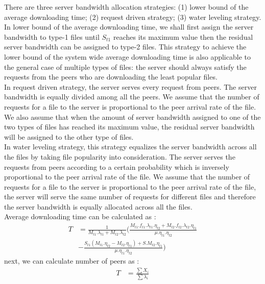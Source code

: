 \documentclass[conference]{IEEEtran}
\begin{document}
There are three server bandwidth allocation strategies:  (1) lower bound of the average downloading time; (2) request driven strategy; (3) water leveling strategy.
In lower bound of the average downloading time, we shall first assign the server bandwidth to type-1 files until $S_{t1}$ reaches its maximum value then the residual server bandwidth can be assigned to type-2 files.
This strategy to achieve the lower bound of the system wide average downloading time is also applicable to the general case of multiple types of files: the server should always satisfy the requests from the peers who are downloading the least popular files.\\
In request driven strategy, the server serves every request from peers. 
The server bandwidth is equally divided among all the peers.
We assume that the number of requests for a file to the server is proportional to the peer arrival rate of the file. 
We also assume that when the amount of server bandwidth assigned to one of the two types of files has reached its maximum value, the residual server bandwidth will be assigned to the other type of files.\\
In water leveling strategy, this strategy equalizes the server bandwidth across all the files by taking file popularity into consideration. 
The server serves the requests from peers according to a certain probability which is inversely proportional to the peer arrival rate of the file.
We assume that the number of requests for a file to the server is proportional to the peer arrival rate of the file, the server will serve the same number of requests for different files and therefore the server bandwidth is equally allocated across all the files.\\
Average downloading time can be calculated as \cite{Sun:2009:POS:1542245.1542249}:
\begin{equation}\label{eqn:averagetimedownload}
\begin{split}
T &= \frac{1}{M_{t1}.\lambda_{t1} + M_{t2}.\lambda_{t2}}(\frac{M_{t1}.f_{t1}.\lambda_{t1}.\eta_{t2} + M_{t2}.f_{t2}.\lambda_{t2}.\eta_{t1}}{\mu.\eta_{t1}.\eta_{t2}}  \\ 
   & - \frac{S_{t1} (M_{t1}.\eta_{t2}-M_{t2}.\eta_{t1}) + S.M_{t2}.\eta_{t1}}{\mu.\eta_{t1}.\eta_{t2}}) 
\end{split}	
\end{equation} 
next, we can calculate number of peers as \cite{Sun:2009:POS:1542245.1542249}:
\begin{equation}\label{eqn:numofpeers}
\begin{split}
T &= \frac{\sum X_i}{\sum \lambda_i}
\end{split}	
\end{equation} 
\end{document}

